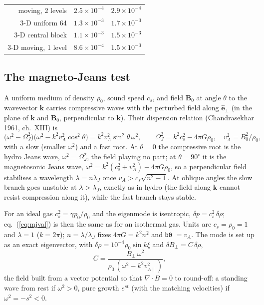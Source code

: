 \documentclass[11pt]{article}
\newcommand{\code}[1]{\texttt{#1}}
\begin{document}
\begin{table}[t]
\begin{tabular}{rrrrr}
moving, 2 levels & \multicolumn{2}{c}{$2.5\times10^{-4}$} & \multicolumn{2}{c}{$2.9\times10^{-4}$} \\
3-D uniform 64   & \multicolumn{2}{c}{$1.3\times10^{-3}$} & \multicolumn{2}{c}{$1.7\times10^{-3}$} \\
3-D central block & \multicolumn{2}{c}{$1.1\times10^{-3}$} & \multicolumn{2}{c}{$1.5\times10^{-3}$} \\
3-D moving, 1 level & \multicolumn{2}{c}{$8.6\times10^{-4}$} & \multicolumn{2}{c}{$1.5\times10^{-3}$} \\
\bottomrule
\end{tabular}
\end{table}

\subsection{The magneto-Jeans test}
\label{sec:mj_test}

A uniform medium of density $\rho_0$, sound speed $c_s$, and field
$\mathbf B_0$ at angle $\theta$ to the wavevector $\mathbf k$ carries compressive waves
with the perturbed field along $\hat{\mathbf e}_\perp$ (in the plane of $\mathbf k$ and
$\mathbf B_0$, perpendicular to $\mathbf k$). Their dispersion relation
(Chandrasekhar 1961, ch.~XIII) is
\begin{equation}
  \bigl(\omega^2 - \Omega_J^2\bigr)\bigl(\omega^2 - k^2 v_A^2\cos^2\theta\bigr)
  = k^2 v_A^2 \sin^2\theta\,\omega^2,
  \qquad \Omega_J^2 = k^2 c_s^2 - 4\pi G\rho_0,\quad v_A^2 = B_0^2/\rho_0 ,
  \label{eq:mjval}
\end{equation}
with a slow (smaller $\omega^2$) and a fast root. At $\theta = 0$ the compressive root is the
hydro Jeans wave, $\omega^2 = \Omega_J^2$, the field playing no part; at $\theta = 90^\circ$ it
is the magnetosonic Jeans wave, $\omega^2 = k^2(c_s^2 + v_A^2) - 4\pi G\rho_0$, so a
perpendicular field stabilises a wavelength $\lambda = n\lambda_J$ once
$v_A > c_s\sqrt{n^2 - 1}$. At oblique angles the slow branch goes unstable at
$\lambda > \lambda_J$, exactly as in hydro (the field along $\mathbf k$ cannot resist
compression along it), while the fast branch stays stable.

For an ideal gas $c_s^2 = \gamma p_0/\rho_0$ and the eigenmode is isentropic,
$\delta p = c_s^2\,\delta\rho$; eq.~(\ref{eq:mjval}) is then the same as for an isothermal
gas. Units are $c_s = \rho_0 = 1$ and $\lambda = 1$ ($k = 2\pi$); $n = \lambda/\lambda_J$ fixes
$4\pi G = k^2 n^2$ and \code{b0} $= v_A$. The mode is set up as an exact eigenvector, with
$\delta\rho = 10^{-4}\rho_0\sin k\xi$ and $\delta B_\perp = C\,\delta\rho$,
\begin{equation}
  C = \frac{B_\perp\,\omega^2}{\rho_0\,(\omega^2 - k^2 v_{A\parallel}^2)},
  \label{eq:mjC}
\end{equation}
the field built from a vector potential so that $\nabla\!\cdot\!B = 0$ to round-off: a
standing wave from rest if $\omega^2 > 0$, pure growth $e^{st}$ (with the matching
velocities) if $\omega^2 = -s^2 < 0$.
\end{document}
